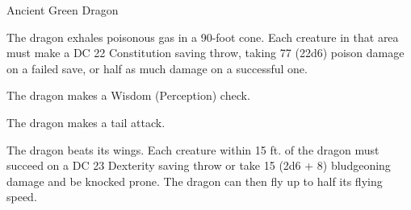 \begin{monsterbox}{Ancient Green Dragon}
\begin{monsteraction}
\end{monsteraction}
\begin{monsteraction}
The dragon exhales poisonous gas in a 90-foot cone. Each creature in that area must make a DC 22 Constitution saving throw, taking 77 (22d6) poison damage on a failed save, or half as much damage on a successful one.
\end{monsteraction}
\begin{monsteraction}[Detect]
The dragon makes a Wisdom (Perception) check.
\end{monsteraction}
\begin{monsteraction}
The dragon makes a tail attack.
\end{monsteraction}
\begin{monsteraction}
The dragon beats its wings. Each creature within 15 ft. of the dragon must succeed on a DC 23 Dexterity saving throw or take 15 (2d6 + 8) bludgeoning damage and be knocked prone. The dragon can then fly up to half its flying speed.
\end{monsteraction}
\end{monsterbox}
